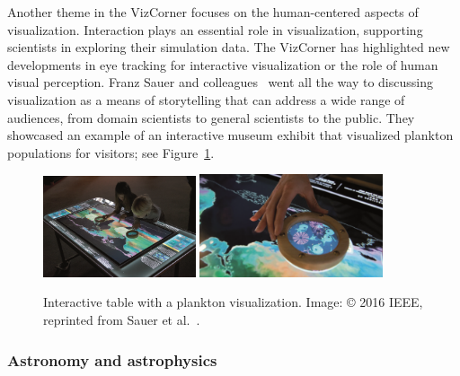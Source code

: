\documentclass[10pt,journal,compsoc]{IEEEtran}
\begin{document}
Another theme in the VizCorner focuses on the human-centered aspects of visualization. Interaction plays an essential role in visualization, supporting scientists in exploring their simulation data. The VizCorner has highlighted new developments in eye tracking for interactive visualization or the role of human visual perception. Franz Sauer and colleagues~\cite{Sauer2016} went all the way to discussing visualization as a means of storytelling that can address a wide range of audiences, from domain scientists to general scientists to the public. They showcased an example of an interactive museum exhibit that visualized plankton populations for visitors; see Figure~\ref{fig:museum}.

\begin{figure}
    \begin{center}    
        \includegraphics[width=0.40\textwidth]{museum1.png} %
        \includegraphics[width=0.48\textwidth]{museum2.png}
        \caption{Interactive table with a plankton visualization. Image: \copyright{} 2016 IEEE, reprinted from Sauer et al.~\cite{Sauer2016}. 
  \label{fig:museum}}        
    \end{center}
\end{figure}



\subsubsection*{Astronomy and astrophysics}

\end{document}
